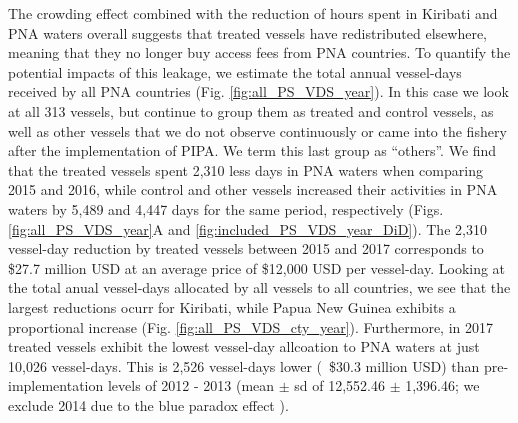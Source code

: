 \documentclass[9p,twocolumn,twoside,lineno]{pnas-new}
\begin{document}
The crowding effect combined with the reduction of hours spent in Kiribati and PNA waters overall suggests that treated vessels have redistributed elsewhere, meaning that they no longer buy access fees from PNA countries. To quantify the potential impacts of this leakage, we estimate the total annual vessel-days received by all PNA countries (Fig. \ref{fig:all_PS_VDS_year}). In this case we look at all 313 vessels, but continue to group them as treated and control vessels, as well as other vessels that we do not observe continuously or came into the fishery after the implementation of PIPA. We term this last group as ``others''. We find that the treated vessels spent 2,310 less days in PNA waters when comparing 2015 and 2016, while control and other vessels increased their activities in PNA waters by 5,489 and 4,447 days for the same period, respectively (Figs. \ref{fig:all_PS_VDS_year}A and \ref{fig:included_PS_VDS_year_DiD}). The 2,310 vessel-day reduction by treated vessels between 2015 and 2017 corresponds to \$27.7 million USD at an average price of \$12,000 USD per vessel-day. Looking at the total anual vessel-days allocated by all vessels to all countries, we see that the largest reductions ocurr for Kiribati, while Papua New Guinea exhibits a proportional increase (Fig. \ref{fig:all_PS_VDS_cty_year}). Furthermore, in 2017 treated vessels exhibit the lowest vessel-day allcoation to PNA waters at just 10,026 vessel-days. This is 2,526 vessel-days lower (~\$30.3 million USD) than pre-implementation levels of 2012 - 2013 (mean $\pm$ sd of 12,552.46 $\pm$ 1,396.46; we exclude 2014 due to the blue paradox effect \cite{mcdermott_2018}). %
\end{document}
